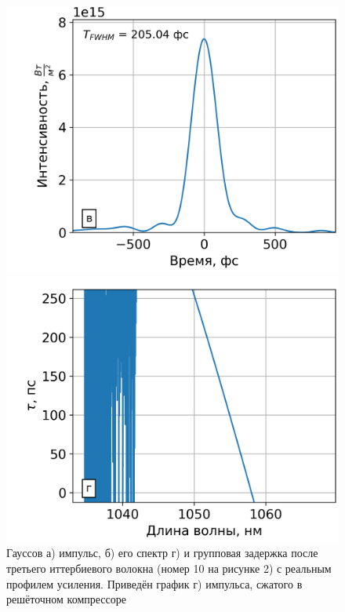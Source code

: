 \documentclass[12pt]{article}
\begin{document}
\begin{figure}[h!]
  \begin{minipage}[b]{0.5\textwidth}
    \includegraphics[width=\linewidth]{Images/Gauss Pulse/После компрессора/23 элемент gamma=51.86558 l_g=0.45239 сжатие}
  \end{minipage}%
  \begin{minipage}[b]{0.5\textwidth}
    \includegraphics[width=\linewidth]{Images/Gauss Pulse/Импульс и спектр/!23. Fiber_time_delay}
  \end{minipage}

  \caption{Гауссов а) импульс, б) его спектр г) и групповая задержка после третьего иттербиевого волокна (номер 10 на
  рисунке 2) с реальным профилем усиления. Приведён график г) импульса, сжатого в решёточном компрессоре}
  \label{fig:both}
\end{figure}
\end{document}
